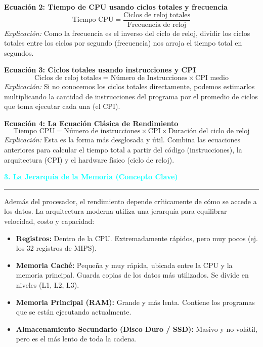 \documentclass{article}
\begin{document}
\vspace{0.4cm}

\textbf{Ecuación 2: Tiempo de CPU usando ciclos totales y frecuencia}
\begin{equation}
\text{Tiempo CPU} = \frac{\text{Ciclos de reloj totales}}{\text{Frecuencia de reloj}}
\end{equation}
\textit{Explicación:} Como la frecuencia es el inverso del ciclo de reloj, dividir los ciclos totales entre los ciclos por segundo (frecuencia) nos arroja el tiempo total en segundos.

\vspace{0.4cm}

\textbf{Ecuación 3: Ciclos totales usando instrucciones y CPI}
\begin{equation}
\text{Ciclos de reloj totales} = \text{Número de Instrucciones} \times \text{CPI medio}
\end{equation}
\textit{Explicación:} Si no conocemos los ciclos totales directamente, podemos estimarlos multiplicando la cantidad de instrucciones del programa por el promedio de ciclos que toma ejecutar cada una (el CPI).

\vspace{0.4cm}

\textbf{Ecuación 4: La Ecuación Clásica de Rendimiento}
\begin{equation}
\text{Tiempo CPU} = \text{Número de instrucciones} \times \text{CPI} \times \text{Duración del ciclo de reloj}
\end{equation}
\textit{Explicación:} Esta es la forma más desglosada y útil. Combina las ecuaciones anteriores para calcular el tiempo total a partir del código (instrucciones), la arquitectura (CPI) y el hardware físico (ciclo de reloj).

\vspace{0.5cm}
\noindent\textcolor{cyan}{\Large\textbf{3. La Jerarquía de la Memoria (Concepto Clave)}}
\vspace{0.2cm}\hrule\vspace{0.3cm}

Además del procesador, el rendimiento depende críticamente de cómo se accede a los datos. La arquitectura moderna utiliza una jerarquía para equilibrar velocidad, costo y capacidad:
\begin{itemize}
    \item \textbf{Registros:} Dentro de la CPU. Extremadamente rápidos, pero muy pocos (ej. los 32 registros de MIPS).
    \item \textbf{Memoria Caché:} Pequeña y muy rápida, ubicada entre la CPU y la memoria principal. Guarda copias de los datos más utilizados. Se divide en niveles (L1, L2, L3).
    \item \textbf{Memoria Principal (RAM):} Grande y más lenta. Contiene los programas que se están ejecutando actualmente.
    \item \textbf{Almacenamiento Secundario (Disco Duro / SSD):} Masivo y no volátil, pero es el más lento de toda la cadena.
\end{itemize}
\end{document}
